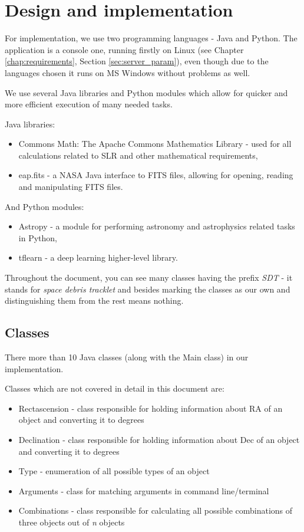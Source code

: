 \chapter{Design and implementation}\label{chap:design}

	For implementation, we use two programming languages - Java and Python. The application is a console one, running firstly on Linux (see Chapter \ref{chap:requirements}, Section \ref{sec:server_param}), even though due to the languages chosen it runs on MS Windows without problems as well.
	
	We use several Java libraries and Python modules which allow for quicker and more efficient execution of many needed tasks.
	
	Java libraries:	
\begin{itemize}
	\item Commons Math: The Apache Commons Mathematics Library - used for all calculations related to SLR and other mathematical requirements,
	\item eap.fits - a NASA Java interface to FITS files, allowing for opening, reading and manipulating FITS files.
\end{itemize}		

	And Python modules:
\begin{itemize}
	\item Astropy - a module for performing astronomy and astrophysics related tasks in Python,
	\item tflearn - a deep learning higher-level library.
\end{itemize}

	Throughout the document, you can see many classes having the prefix \emph{SDT} - it stands for \emph{space debris tracklet} and besides marking the classes as our own and distinguishing them from the rest means nothing.

\section{Classes}\label{sec:classes}

	There more than 10 Java classes (along with the Main class) in our implementation.
	
	Classes which are not covered in detail in this document are:
	
\begin{itemize}
	\item Rectascension - class responsible for holding information about RA of an object and converting it to degrees
	\item Declination - class responsible for holding information about Dec of an object and converting it to degrees
	\item Type - enumeration of all possible types of an object
	\item Arguments - class for matching arguments in command line/terminal
	\item Combinations - class responsible for calculating all possible combinations of three objects out of \emph{n} objects
\end{itemize}


